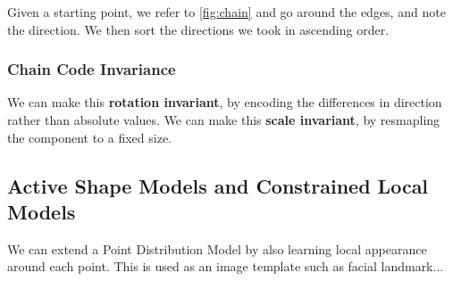 Given a starting point, we refer to \ref{fig:chain} and go around the edges, and note the direction. We then sort the directions we took in ascending order.

\subsubsection{Chain Code Invariance}

We can make this \textbf{rotation invariant}, by encoding the differences in direction rather than absolute values. We can make this \textbf{scale invariant}, by resmapling the component to a fixed size.

\subsection{Active Shape Models and Constrained Local Models}

We can extend a Point Distribution Model by also learning local appearance around each point. This is used as an image template such as facial landmark...


